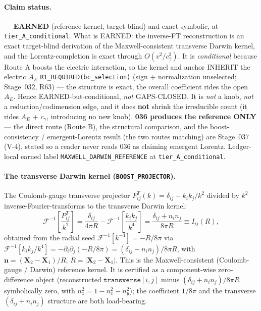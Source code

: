 \paragraph{Claim status.}
\StatusExactClosure{} --- \textbf{EARNED} (reference kernel, target-blind) and
exact-symbolic, at \texttt{tier\_A\_conditional}. What is EARNED: the inverse-FT
reconstruction is an exact target-blind derivation of the Maxwell-consistent
transverse Darwin kernel, and the Lorentz-completion is exact through
\(O(v^2/c_\gamma^2)\). It is \emph{conditional} because Route A boosts the
electric interaction, so the kernel and anchor INHERIT the electric \(A_E\)
\texttt{R1\_REQUIRED(bc\_selection)} (sign + normalization unselected; Stage~032,
R63) --- the structure is exact, the overall coefficient rides the open \(A_E\).
Hence EARNED-but-conditional, \emph{not} GAPS-CLOSED. It is \emph{not} a knob,
\emph{not} a reduction/codimension edge, and it does \textbf{not} shrink the
irreducible count (it rides \(A_E\) + \(c_\gamma\), introducing no new knob).
\textbf{036 produces the reference ONLY} --- the direct route (Route B), the
structural comparison, and the boost-consistency / emergent-Lorentz result (the
two routes matching) are Stage~037 (V-4), stated so a reader never reads 036 as
claiming emergent Lorentz. Ledger-local earned label
\texttt{MAXWELL\_DARWIN\_REFERENCE} at \texttt{tier\_A\_conditional}.

\paragraph{The transverse Darwin kernel (\texttt{BOOST\_PROJECTOR}).}
The Coulomb-gauge transverse projector \(P^T_{ij}(k)=\delta_{ij}-k_ik_j/k^2\)
divided by \(k^2\) inverse-Fourier-transforms to the transverse Darwin kernel:
\[
  \mathcal F^{-1}\!\left[\frac{P^T_{ij}}{k^2}\right]
  =\frac{\delta_{ij}}{4\pi R}-\mathcal F^{-1}\!\left[\frac{k_ik_j}{k^4}\right]
  =\frac{\delta_{ij}+n_in_j}{8\pi R}\equiv I_{ij}(R),
\]
obtained from the radial seed \(\mathcal F^{-1}[k^{-4}]=-R/8\pi\) via
\(\mathcal F^{-1}[k_ik_j/k^4]=-\partial_i\partial_j(-R/8\pi)
=(\delta_{ij}-n_in_j)/8\pi R\), with \(\mathbf n=(\mathbf X_2-\mathbf X_1)/R\),
\(R=|\mathbf X_2-\mathbf X_1|\). This is the Maxwell-consistent (Coulomb-gauge /
Darwin) reference kernel. It is certified as a component-wise zero-difference
object (reconstructed \(\texttt{transverse}[i,j]\) minus \((\delta_{ij}+n_in_j)/8\pi R\)
symbolically zero, with \(n_z^2=1-n_x^2-n_y^2\)); the coefficient \(1/8\pi\) and
the transverse \((\delta_{ij}+n_in_j)\) structure are both load-bearing.

